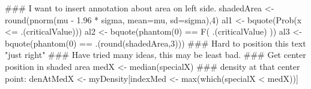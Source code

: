 \begin{Schunk}
\begin{Sinput}
 ### I want to insert annotation about area on left side.
 shadedArea <- round(pnorm(mu - 1.96 * sigma, mean=mu, sd=sigma),4)
 al1 <- bquote(Prob(x <= .(criticalValue)))
 al2 <- bquote(phantom(0) == F( .(criticalValue) ))
 al3 <- bquote(phantom(0) == .(round(shadedArea,3)))
 ### Hard to position this text "just right"
 ### Have tried many ideas, this may be least bad.
 ### Get center position in shaded area
 medX <- median(specialX)
 ### density at that center point:
 denAtMedX <- myDensity[indexMed <- max(which(specialX < medX))]
\end{Sinput}
\end{Schunk}
